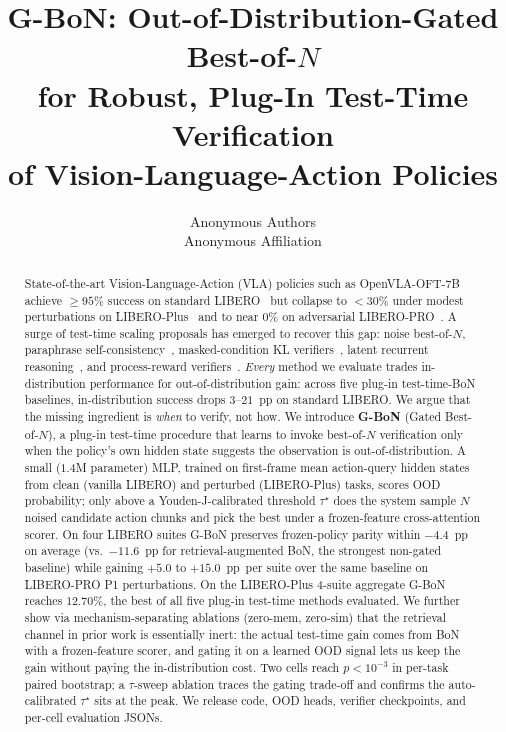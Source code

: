 \documentclass{article}
\title{G-BoN: Out-of-Distribution-Gated Best-of-$N$\\
       for Robust, Plug-In Test-Time Verification\\
       of Vision-Language-Action Policies}
\author{
  Anonymous Authors \\
  Anonymous Affiliation
}
\begin{document}
\maketitle

\begin{abstract}
State-of-the-art Vision-Language-Action (VLA) policies such as
OpenVLA-OFT-7B~\citep{kim2025openvlaoft} achieve $\geq 95\%$ success
on standard LIBERO~\citep{liu2023libero} but collapse to
$<30\%$ under modest perturbations on
LIBERO-Plus~\citep{libero_plus2025} and to near $0\%$ on adversarial
LIBERO-PRO~\citep{libero_pro2025}. A surge of test-time scaling
proposals has emerged to recover this gap: noise best-of-$N$,
paraphrase self-consistency~\citep{cover_vla2025},
masked-condition KL verifiers~\citep{mgselect2026}, latent recurrent
reasoning~\citep{rdvla2025}, and process-reward
verifiers~\citep{rover2026}. \emph{Every} method we evaluate trades
in-distribution performance for out-of-distribution gain: across
five plug-in test-time-BoN baselines, in-distribution success drops
$3$--$21$~pp on standard LIBERO. We argue that the missing
ingredient is \emph{when} to verify, not how. We introduce
\textbf{G-BoN} (Gated Best-of-$N$), a plug-in test-time procedure
that learns to invoke best-of-$N$ verification only when the policy's
own hidden state suggests the observation is out-of-distribution.
A small ($1.4$M parameter) MLP, trained on first-frame mean
action-query hidden states from clean (vanilla LIBERO) and
perturbed (LIBERO-Plus) tasks, scores OOD probability; only above
a Youden-J-calibrated threshold $\tau^\star$ does the system
sample $N$ noised candidate action chunks and pick the best under
a frozen-feature cross-attention scorer. On four LIBERO suites
G-BoN preserves frozen-policy parity within $-4.4$~pp on average
(vs.\ $-11.6$~pp for retrieval-augmented BoN, the strongest
non-gated baseline) while gaining $+5.0$ to $+15.0$~pp~per suite over
the same baseline on LIBERO-PRO P1 perturbations. On the LIBERO-Plus
4-suite aggregate G-BoN reaches $12.70\%$, the best of all five
plug-in test-time methods evaluated. We further show via
mechanism-separating ablations (zero-mem, zero-sim) that the
retrieval channel in prior work is essentially inert: the actual
test-time gain comes from BoN with a frozen-feature scorer, and
gating it on a learned OOD signal lets us keep the gain without
paying the in-distribution cost. Two cells reach $p<10^{-3}$ in
per-task paired bootstrap; a $\tau$-sweep ablation traces the gating
trade-off and confirms the auto-calibrated $\tau^\star$ sits at the
peak. We release code, OOD heads, verifier checkpoints, and per-cell
evaluation JSONs.
\end{abstract}
\end{document}
